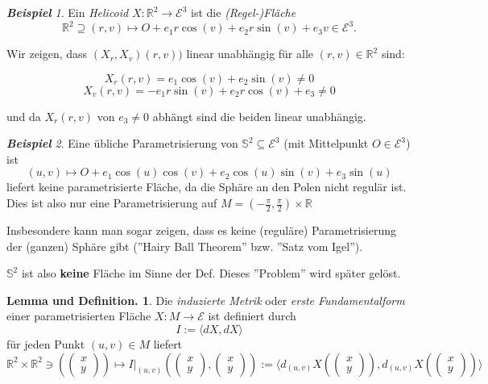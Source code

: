 \documentclass[a4paper,oneside,11pt,DIV=12,parskip=half]{scrartcl}
\newcommand{\R}{\mathbb R}
\newcommand{\E}{\mathcal E}
\theoremstyle{plain}
\theoremstyle{definition}
\newtheorem{remark, definition}[theorem]{Bemerkung und Definition.}
\newtheorem{lemma, definition}[theorem]{Lemma und Definition.}
\theoremstyle{remark}
\newtheorem*{example}{\textbf{Beispiel}}
\newtheorem*{remark, example}{\textbf{Bemerkung und Beispiel}}
\begin{document}
\begin{example}
	


Ein \emph{Helicoid} $ X: \R^2 \rightarrow \E^3 $ ist die \emph{(Regel-)Fläche}  
\[ \R^2 \supseteq (r,v) \mapsto O + e_1r \cos(v) + e_2 r \sin(v) + e_3 v \in \E^3. \]

Wir zeigen, dass $(X_r,X_v)(r,v))$ linear unabhängig für alle $ (r,v) \in \R^2 $ sind:

\[ X_r(r,v) = e_1\cos(v) + e_2 \sin(v) \neq 0 \]
\[ X_v(r,v) = -e_1r \sin(v) + e_2 r \cos(v) + e_3 \neq 0 \]

und da $ X_r(r,v) $ von $e_3 \neq 0$  abhängt sind die beiden linear unabhängig.

\end{example}

\begin{example}
	
	Eine übliche Parametrisierung von $ \mathbb{S}^2 \subseteq \E^3 $ (mit Mittelpunkt $O \in \E^3$) ist  
	\[ (u,v) \mapsto O + e_1\cos(u)\cos(v) + e_2\cos(u)\sin(v)+e_3\sin(u) \]
	liefert keine parametrisierte Fläche, da die Sphäre an den Polen nicht regulär ist.
	Dies ist also nur eine Parametrisierung auf $ M = (-\frac{\pi}{2},\frac{\pi}{2}) \times \R $
	
	Insbesondere kann man sogar zeigen, dass es keine (reguläre) Parametrisierung der (ganzen) Sphäre gibt (''Hairy Ball Theorem'' bzw. ''Satz vom Igel'').
	
	$ \mathbb{S}^2 $ ist also \textbf{keine} Fläche im Sinne der Def. Dieses ''Problem'' wird später gelöst.
\end{example}

\begin{lemma, definition}
	
	Die \emph{induzierte Metrik} oder \emph{erste Fundamentalform} einer parametrisierten Fläche $ X: M \rightarrow \E$ ist definiert durch
	\[ I := \langle dX,dX \rangle \]
	für jeden Punkt $ (u,v) \in M $ liefert 
	\[ \R^2 \times \R^2 \ni (\begin{pmatrix}
	x \\
	y
	\end{pmatrix})  \mapsto I \big|_{(u,v)}(\begin{pmatrix}
	x \\
	y
	\end{pmatrix},\begin{pmatrix}
	x \\
	y
	\end{pmatrix}) := \langle d_{(u,v)}X(\begin{pmatrix}
	x \\
	y
	\end{pmatrix}),  d_{(u,v)}X(\begin{pmatrix}
	x \\
	y
	\end{pmatrix})  \rangle \]
\end{lemma, definition}
\end{document}
